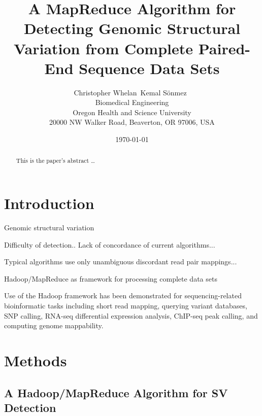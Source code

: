 \documentclass[12pt]{article}
\begin{document}
\title{A MapReduce Algorithm for Detecting Genomic Structural Variation from Complete Paired-End Sequence Data Sets}

\author{
Christopher Whelan\ Kemal S\"onmez\ \\
Biomedical Engineering \\
Oregon Health and Science University \\
20000 NW Walker Road, Beaverton, OR 97006, USA
}

\date{\today}

\maketitle

\begin{abstract}
This is the paper's abstract \ldots
\end{abstract}

\section{Introduction}

Genomic structural variation



Difficulty of detection.. Lack of concordance of current algorithms...

Typical algorithms use only unambiguous discordant read pair mappings...

Hadoop/MapReduce as framework for processing complete data sets

Use of the Hadoop framework has been demonstrated for sequencing-related bioinformatic tasks including short read mapping, \cite{Schatz:2009p278} querying variant databases, \cite{Oconnor:2010p1835} SNP calling, \cite{Langmead:2009p1225} RNA-seq differential expression analysis, \cite{Langmead:2010p1268} ChIP-seq peak calling, \cite{Feng:2011p1228} and computing genome mappability. \cite{Lee:2012bk}

\section{Methods}\label{Methods}

\subsection{A Hadoop/MapReduce Algorithm for SV Detection}
\end{document}
